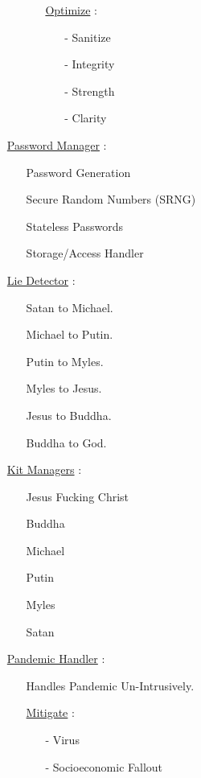 \documentclass[11pt]{article}
\begin{document}
\begin{enumerate}
\begin{enumerate}
\begin{enumerate}
			\item[] \ul{Optimize} :
			\begin{enumerate}
				\item[-] Sanitize
				\item[-] Integrity
				\item[-] Strength
				\item[-] Clarity
			\end{enumerate}
		\end{enumerate}
	\end{enumerate}

	\item[] \ul{Password Manager} :
	\begin{enumerate}
		\item[] Password Generation
		\item[] Secure Random Numbers (SRNG)
		\item[] Stateless Passwords
		\item[] Storage/Access Handler
	\end{enumerate}

	\item[] \ul{Lie Detector} :
	\begin{enumerate}
		\item[] Satan to Michael.
		\item[] Michael to Putin.
		\item[] Putin to Myles.
		\item[] Myles to Jesus.
		\item[] Jesus to Buddha.
		\item[] Buddha to God.
	\end{enumerate}

	\item[] \ul{Kit Managers} :
	\begin{enumerate}
		\item[] Jesus Fucking Christ
		\item[] Buddha
		\item[] Michael
		\item[] Putin
		\item[] Myles
		\item[] Satan
	\end{enumerate}

	\item[] \ul{Pandemic Handler} :
	\begin{enumerate}
		\item[] Handles Pandemic Un-Intrusively.
		\item[] \ul{Mitigate} :
		\begin{enumerate}
			\item[-] Virus
			\item[-] Socioeconomic Fallout
		\end{enumerate}
	\end{enumerate}
\end{enumerate}
\end{document}

